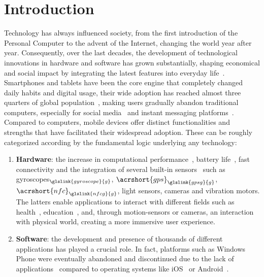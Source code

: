 \chapter{Introduction}
\label{cap:introduction}

Technology has always influenced society, from the first introduction of the Personal Computer to the advent of the Internet, changing the world year after year. Consequently, over the last decades, the development of technological innovations in hardware and software has grown substantially, shaping economical and social impact by integrating the latest features into everyday life~\cite{site:innovations-impact,site:innovations-increases}. Smartphones and tablets have been the core engine that completely changed daily habits and digital usage, their wide adoption has reached almost three quarters of global population~\cite{site:mobile-ownership,site:mobile-sales}, making users gradually abandon traditional computers, especially for social media~\cite{site:mobile-facebook-usage} and instant messaging platforms~\cite{site:mobile-messageapp-downloads}. 
Compared to computers, mobile devices offer distinct functionalities and strengths that have facilitated their widespread adoption. These can be roughly categorized according by the fundamental logic underlying any technology:
\begin{enumerate}
    \item \textbf{Hardware}: the increase in computational performance~\cite{site:mobile-performance}, battery life~\cite{site:mobile-battery-increase}, fast connectivity and the integration of several built-in sensors~\cite{site:mobile-sensors} such as gyroscopes$_{\glslink{gyroscope}{g}}$, $\acrshort{gps}_{\glslink{gpsg}{g}}$, $\acrshort{nfc}_{\glslink{nfcg}{g}}$, light sensors, cameras and vibration motors. The latters enable applications to interact with different fields such as health~\cite{site:mobile-health-monitoring}, education~\cite{site:mobile-education}, and, through motion-sensors or cameras, an interaction with physical world, creating a more immersive user experience.

    \item \textbf{Software}: the development and presence of thousands of different applications has played a crucial role. In fact, platforms such as Windows Phone were eventually abandoned and discontinued due to the lack of applications~\cite{site:windowsphone-appgap-1,site:windowsphone-appgap-2} compared to operating systems like iOS~\cite{site:iOS} or Android~\cite{site:Android}. 
\end{enumerate}

